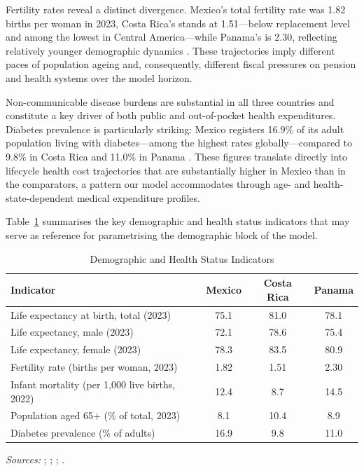 \documentclass[12pt,a4paper]{article}
\begin{document}
Fertility rates reveal a distinct divergence. Mexico's total fertility
rate was 1.82 births per woman in 2023, Costa Rica's stands at
1.51---below replacement level and among the lowest in Central
America---while Panama's is 2.30, reflecting relatively younger
demographic dynamics \citep{WorldBankWDI2024}. These trajectories imply
different paces of population ageing and, consequently, different
fiscal pressures on pension and health systems over the model horizon.

Non-communicable disease burdens are substantial in all three countries
and constitute a key driver of both public and out-of-pocket health
expenditures. Diabetes prevalence is particularly striking: Mexico
registers 16.9\% of its adult population living with diabetes---among
the highest rates globally---compared to 9.8\% in Costa Rica and
11.0\% in Panama \citep{OECDHaG2023}. These figures translate directly
into lifecycle health cost trajectories that are substantially higher
in Mexico than in the comparators, a pattern our model accommodates
through age- and health-state-dependent medical expenditure profiles.

Table~\ref{tab:demog} summarises the key demographic and health status
indicators that may serve as reference for parametrising the
demographic block of the model.

\begin{table}[htbp]
\centering
\caption{Demographic and Health Status Indicators}
\label{tab:demog}
\begin{tabular}{lccc}
\hline\hline
\textbf{Indicator} & \textbf{Mexico} & \textbf{Costa Rica} & \textbf{Panama} \\
\hline
Life expectancy at birth, total (2023)           & 75.1 & 81.0 & 78.1 \\
Life expectancy, male (2023)                     & 72.1 & 78.6 & 75.4 \\
Life expectancy, female (2023)                   & 78.3 & 83.5 & 80.9 \\
Fertility rate (births per woman, 2023)          & 1.82 & 1.51 & 2.30 \\
Infant mortality (per 1{,}000 live births, 2022) & 12.4 & 8.7  & 14.5 \\
Population aged 65+ (\% of total, 2023)          & 8.1  & 10.4 & 8.9  \\
Diabetes prevalence (\% of adults)               & 16.9 & 9.8  & 11.0 \\
\hline\hline
\end{tabular}
\begin{minipage}{\linewidth}
\smallskip
\footnotesize
\textit{Sources:} \citet{PAHOHIA2024}; \citet{WHOGHO2024};
\citet{WorldBankWDI2024}; \citet{OECDHaG2023}.
\end{minipage}
\end{table}
\end{document}
